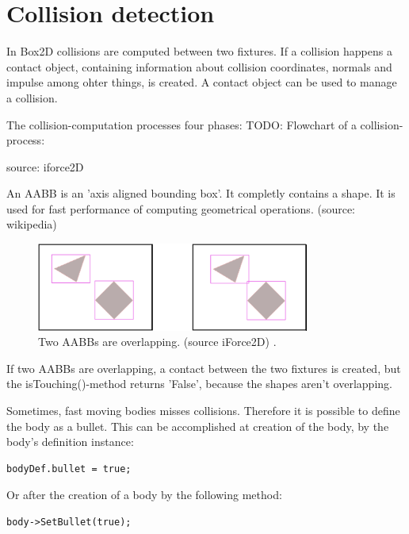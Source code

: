 \documentclass[10pt,a4paper,DIV=11]{scrreprt}
\begin{document}
\section{Collision detection}
In Box2D collisions are computed between two fixtures. If a collision happens a contact object, containing information about collision coordinates, normals and impulse among ohter things, is created. A contact object can be used to manage a collision.

The collision-computation processes four phases:
TODO: Flowchart of a collision-process:


source: iforce2D


An AABB is an 'axis aligned bounding box'. It completly contains a shape. It is used for fast performance of computing geometrical operations. (source: wikipedia)

\begin{center}
	\begin{figure}[H]
		\centering
		\includegraphics[width=0.8\textwidth,scale=1.0]{files/aabbs-crossing.png}  
		\caption{Two AABBs are overlapping. (source iForce2D) \cite{box2d-iforce}.}
		\label{fig:aabbs}
	\end{figure}
\end{center}
If two AABBs are overlapping, a contact between the two fixtures is created, but the isTouching()-method returns 'False', because the shapes aren't overlapping.

Sometimes, fast moving bodies misses collisions. Therefore it is possible to define the body as a bullet.
This can be accomplished at creation of the body, by the body's definition instance:

\begin{lstlisting}[caption={Define fixture as bullet before creation},label=lst:fixture-bullet-before]
bodyDef.bullet = true;
\end{lstlisting}

Or after the creation of a body by the following method:

\begin{lstlisting}[caption={Define fixture as bullet after creation},label=lst:fixture-bullet-after]
body->SetBullet(true);
\end{lstlisting}
\end{document}

